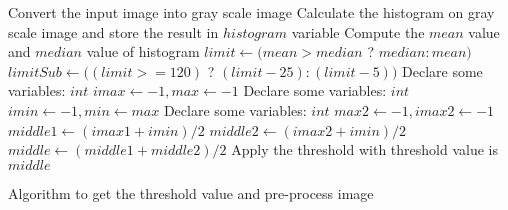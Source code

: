\begin{algorithm}[H]
\SetAlgoLined
\Indm 
{}
\Indp
Convert the input image into gray scale image\;
Calculate the histogram on gray scale image and store the result in $histogram$ variable \;
Compute the $mean$ value and $median$ value of histogram\;
$limit \leftarrow (mean > median$ ? $median : mean)$\;
$limitSub \leftarrow ((limit >= 120)$ ? $(limit - 25) : (limit - 5))$\;
Declare some variables: $int$ $imax \leftarrow -1, max \leftarrow -1$\;
Declare some variables: $int$ $imin \leftarrow -1, min \leftarrow max$\;
Declare some variables: $int$ $max2 \leftarrow -1, imax2 \leftarrow -1$\;
$middle1 \leftarrow (imax1 + imin)/2$ \;
$middle2 \leftarrow (imax2 + imin)/2$ \;
$middle \leftarrow (middle1 + middle2)/2$ \;
Apply the threshold with threshold value is $middle$\;
\caption{Algorithm to get the threshold value and pre-process image}
\label{al_preprocess}
\end{algorithm}\DecMargin{1em}
